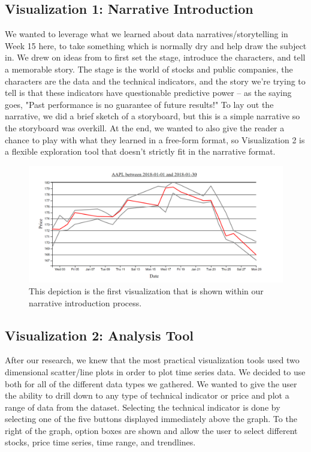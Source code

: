 \documentclass{vgtc}                          %
\begin{document}
\subsection{Visualization 1: Narrative Introduction}
We wanted to leverage what we learned about data narratives/storytelling in Week 15 here, to take something which is normally dry and help draw the subject in. We drew on ideas from \cite{storytelling} to first set the stage, introduce the characters, and tell a memorable story. The stage is the world of stocks and public companies, the characters are the data and the technical indicators, and the story we're trying to tell is that these indicators have questionable predictive power -- as the saying goes, "Past performance is no guarantee of future results!" To lay out the narrative, we did a brief sketch of a storyboard, but this is a simple narrative so the storyboard was overkill. At the end, we wanted to also give the reader a chance to play with what they learned in a free-form format, so Visualization 2 is a flexible exploration tool that doesn't strictly fit in the narrative format.

\begin{figure}[h]
	\centering
	\includegraphics[scale=0.4]{vis1}
	\caption{This depiction is the first visualization that is shown within our narrative introduction process.}
\end{figure}

\subsection{Visualization 2: Analysis Tool}
After our research, we knew that the most practical visualization tools used two dimensional scatter/line plots in order to plot time series data.  We decided to use both for all of the different data types we gathered. We wanted to give the user the ability to drill down to any type of technical indicator or price and plot a range of data from the dataset.  Selecting the technical indicator is done by selecting one of the five buttons displayed immediately above the graph.  To the right of the graph, option boxes are shown and allow the user to select different stocks, price time series, time range, and trendlines.    
\end{document}
